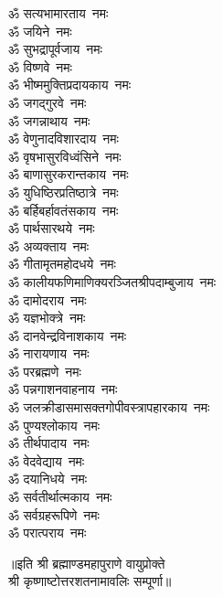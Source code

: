 \begin{multicols}{2}
\begin{flushleft}
ॐ सत्यभामारताय~नमः\\
ॐ जयिने~नमः\hfill{}\\
ॐ सुभद्रापूर्वजाय~नमः\\
ॐ विष्णवे~नमः\\
ॐ भीष्ममुक्तिप्रदायकाय~नमः\\
ॐ जगद्गुरवे~नमः\\
ॐ जगन्नाथाय~नमः\\
ॐ वेणुनादविशारदाय~नमः\\
ॐ वृषभासुरविध्वंसिने~नमः\\
ॐ बाणासुरकरान्तकाय~नमः\\
ॐ युधिष्ठिरप्रतिष्ठात्रे~नमः\\
ॐ बर्हिबर्हावतंसकाय~नमः\hfill{}\\
ॐ पार्थसारथये~नमः\\
ॐ अव्यक्ताय~नमः\\
ॐ गीतामृतमहोदधये~नमः\\
ॐ कालीयफणिमाणिक्य\-रञ्जित\-श्री\-पदाम्बुजाय~नमः\\
ॐ दामोदराय~नमः\\
ॐ यज्ञभोक्त्रे~नमः\\
ॐ दानवेन्द्रविनाशकाय~नमः\\
ॐ नारायणाय~नमः\\
ॐ परब्रह्मणे~नमः\\
ॐ पन्नगाशनवाहनाय~नमः\hfill{}\\
ॐ जलक्रीडासमासक्त\-गोपी\-वस्त्रापहारकाय~नमः\\
ॐ पुण्यश्लोकाय~नमः\\
ॐ तीर्थपादाय~नमः\\
ॐ वेदवेद्याय~नमः\\
ॐ दयानिधये~नमः\\
ॐ सर्वतीर्थात्मकाय~नमः\\
ॐ सर्वग्रहरूपिणे~नमः\\
ॐ परात्पराय~नमः\\
\end{flushleft}
\end{multicols}
{\centering ॥इति श्री ब्रह्माण्डमहापुराणे वायुप्रोक्ते\\श्री कृष्णाष्टोत्तरशतनामावलिः सम्पूर्णा॥}
